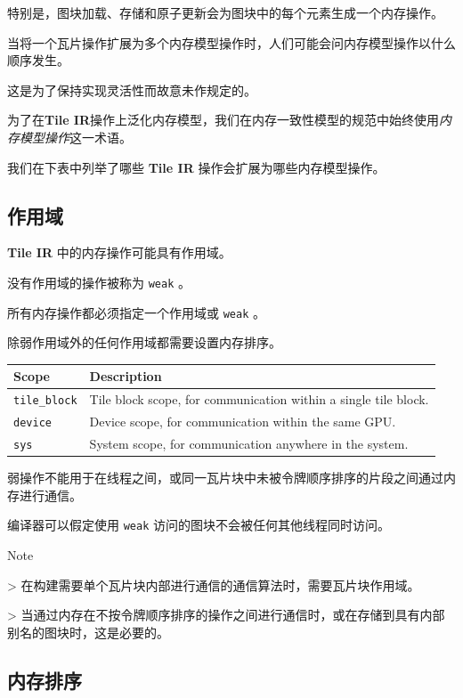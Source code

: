 \documentclass{article}
\begin{document}
特别是，图块加载、存储和原子更新会为图块中的每个元素生成一个内存操作。

当将一个瓦片操作扩展为多个内存模型操作时，人们可能会问内存模型操作以什么顺序发生。

这是为了保持实现灵活性而故意未作规定的。


为了在\textbf{Tile IR}操作上泛化内存模型，我们在内存一致性模型的规范中始终使用\textit{内存模型操作}这一术语。

我们在下表中列举了哪些 \textbf{Tile IR} 操作会扩展为哪些内存模型操作。



\subsection{作用域}

\textbf{Tile IR} 中的内存操作可能具有作用域。

没有作用域的操作被称为 \texttt{weak} 。

所有内存操作都必须指定一个作用域或 \texttt{weak} 。

除弱作用域外的任何作用域都需要设置内存排序。


\begin{longtable}{l|l}
\hline
Scope & Description \\ \hline
\texttt{tile\_block} & Tile block scope, for communication within a single tile block. \\ \hline
\texttt{device} & Device scope, for communication within the same GPU. \\ \hline
\texttt{sys} & System scope, for communication anywhere in the system. \\ \hline
\end{longtable}

弱操作不能用于在线程之间，或同一瓦片块中未被令牌顺序排序的片段之间通过内存进行通信。

编译器可以假定使用 \texttt{weak} 访问的图块不会被任何其他线程同时访问。


Note

> 在构建需要单个瓦片块内部进行通信的通信算法时，需要瓦片块作用域。

> 当通过内存在不按令牌顺序排序的操作之间进行通信时，或在存储到具有内部别名的图块时，这是必要的。



\subsection{内存排序}
\end{document}
